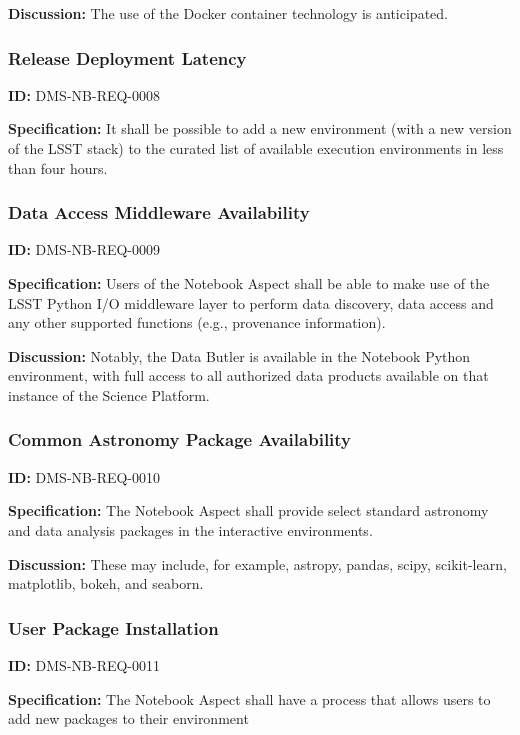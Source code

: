 \documentclass[SE,toc,lsstdraft]{lsstdoc}
\begin{document}
\textbf{Discussion:}
The use of the Docker container technology is anticipated.

\subsubsection{Release Deployment Latency}

\label{DMS-NB-REQ-0008}
\textbf{ID:} DMS-NB-REQ-0008

\textbf{Specification:}
It shall be possible to add a new environment (with a new version of the LSST stack) to the curated list of available execution environments in less than four hours.

\subsubsection{Data Access Middleware Availability}

\label{DMS-NB-REQ-0009}
\textbf{ID:} DMS-NB-REQ-0009

\textbf{Specification:}
Users of the Notebook Aspect shall be able to make use of the LSST Python I/O middleware layer to perform data discovery, data access and any other supported functions  (e.g., provenance information).

\textbf{Discussion:}
Notably, the Data Butler is available in the Notebook Python environment, with full access to all authorized data products available on that instance of the Science Platform.

\subsubsection{Common Astronomy Package Availability}

\label{DMS-NB-REQ-0010}
\textbf{ID:} DMS-NB-REQ-0010

\textbf{Specification:}
The Notebook Aspect shall provide select standard astronomy and data analysis packages in the interactive environments.

\textbf{Discussion:}
These may include, for example, astropy, pandas, scipy, scikit-learn, matplotlib, bokeh, and seaborn.

\subsubsection{User Package Installation}

\label{DMS-NB-REQ-0011}
\textbf{ID:} DMS-NB-REQ-0011

\textbf{Specification:}
The Notebook Aspect shall have a process that allows users to add new packages to their environment
\end{document}
